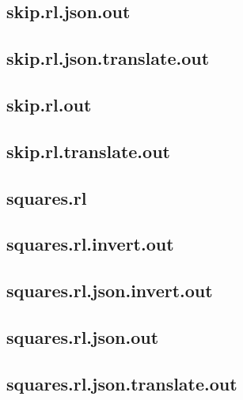 \subsection{skip.rl.json.out}
\label{app:skip_rl.json.out}

\subsection{skip.rl.json.translate.out}
\label{app:skip_rl.json.translate.out}

\subsection{skip.rl.out}
\label{app:skip_rl.out}

\subsection{skip.rl.translate.out}
\label{app:skip_rl.translate.out}

\subsection{squares.rl}
\label{app:squares_rl}

\subsection{squares.rl.invert.out}
\label{app:squares_rl.invert.out}

\subsection{squares.rl.json.invert.out}
\label{app:squares_rl.json.invert.out}

\subsection{squares.rl.json.out}
\label{app:squares_rl.json.out}

\subsection{squares.rl.json.translate.out}
\label{app:squares_rl.json.translate.out}

